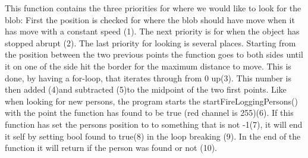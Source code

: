 This function contains the three priorities for where we would like to look for the blob: First the position is checked for where the blob should have move when it has move with a constant speed (1). The next priority is for when the object has stopped abrupt (2). The last priority for looking is several places. Starting from the position between the two previous points the function goes to both sides until it on one of the side hit the border for the maximum distance to move. This is done, by having a for-loop, that iterates through from 0 up(3). This number is then added (4)and subtracted (5)to the midpoint of the two first points. Like when looking for new persons, the program starts the startFireLoggingPersons() with the point the function has found to be true (red channel is 255)(6). If this function has set the persons position to to something that is not -1(7), it will end it self by setting bool found to true(8) in the loop breaking (9). In the end of the function it will return if the person was found or not (10).
	
	
	
